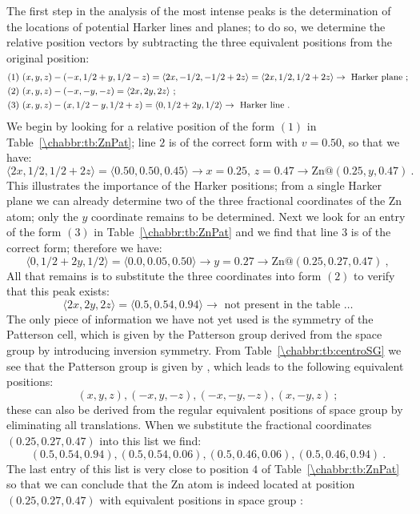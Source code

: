 The first step in the analysis of the most intense peaks is the determination of the locations of potential Harker lines and planes; to do so, we determine the relative position vectors by subtracting the three equivalent positions from the original position:
\begin{equation*}
{\small
\begin{split}
	(1)\,\, &(x,y,z)-(-x,1/2+y,1/2-z)=\langle2x,-1/2,-1/2+2z\rangle = \langle2x,1/2,1/2+2z\rangle\rightarrow\text{ Harker plane}\ ;\\
	(2)\,\, &(x,y,z)-(-x,-y,-z)=\langle 2x,2y,2z\rangle\ ;\\
	(3)\,\, &(x,y,z)-(x,1/2-y,1/2+z)=\langle 0,1/2+2y,1/2\rangle\rightarrow\text{ Harker line}\ .
\end{split}}
\end{equation*}
We begin by looking for a relative position of the form $(1)$ in Table~\ref{\chabbr:tb:ZnPat}; line $2$ is of the correct form with $v=0.50$, so that we have:
\[
	\langle 2x,1/2,1/2+2z\rangle=\langle0.50,0.50,0.45\rangle \rightarrow x=0.25,\, z=0.47 \rightarrow \text{Zn@}(0.25,y,0.47)\ .
\]
This illustrates the importance of the Harker positions; from a single Harker plane we can already determine two of the three fractional coordinates of the Zn atom; only the $y$ coordinate remains to be determined.  Next we look for an entry of the form $(3)$ in Table~\ref{\chabbr:tb:ZnPat} and we find that line $3$ is of the correct form; therefore we have:
\[
	\langle 0,1/2+2y,1/2\rangle=\langle0.0,0.05,0.50\rangle \rightarrow y=0.27 \rightarrow \text{Zn@}(0.25,0.27,0.47)\ ,
\]
All that remains is to substitute the three coordinates into form $(2)$ to verify that this peak exists:
\[
	\langle 2x,2y,2z\rangle=\langle0.5,0.54,0.94\rangle \rightarrow \text{ not present in the table }\ldots
\]
The only piece of information we have not yet used is the symmetry of the Patterson cell, which is given by the Patterson group derived from the space group by introducing  inversion symmetry. From Table~\ref{\chabbr:tb:centroSG} we see that the Patterson group is given by  , which leads to the following equivalent positions:
\[
  (x,y,z), (-x,y,-z), (-x,-y,-z), (x,-y,z)\ ;
\]
these can also be derived from the regular equivalent positions of space group  by eliminating all translations.  When we substitute the fractional coordinates $(0.25,0.27,0.47)$ into this list we find:
\[
	(0.5,0.54,0.94), (0.5,0.54,0.06), (0.5,0.46,0.06),(0.5,0.46,0.94)\ .
\]
The last entry of this list is very close to position $4$ of Table~\ref{\chabbr:tb:ZnPat} so that we can conclude that the Zn atom is indeed located at position $(0.25,0.27,0.47)$ with equivalent positions in space group :
